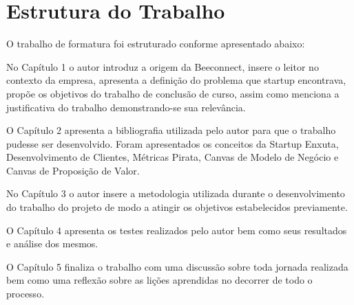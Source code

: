 \section{Estrutura do Trabalho}
\label{cha:estrutura_do_trabalho}
O trabalho de formatura foi estruturado conforme apresentado abaixo:

No Capítulo 1 o autor introduz a origem da Beeconnect, insere o leitor no contexto da empresa, apresenta a definição do problema que startup encontrava, propõe os objetivos do trabalho de conclusão de curso, assim como menciona a justificativa do trabalho demonstrando-se sua relevância.

O Capítulo 2 apresenta a bibliografia utilizada pelo autor para que o trabalho pudesse ser desenvolvido. Foram apresentados os conceitos da Startup Enxuta, Desenvolvimento de Clientes, Métricas Pirata, Canvas de Modelo de Negócio e Canvas de Proposição de Valor.

No Capítulo 3 o autor insere a metodologia utilizada durante o desenvolvimento do trabalho do projeto de modo a atingir os objetivos estabelecidos previamente.

O Capítulo 4 apresenta os testes realizados pelo autor bem como seus resultados e análise dos mesmos.

O Capítulo 5 finaliza o trabalho com uma discussão sobre toda jornada realizada bem como uma reflexão sobre as lições aprendidas no decorrer de todo o processo.